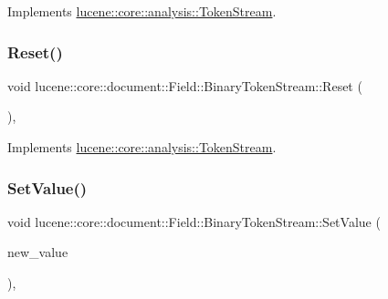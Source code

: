 Implements \mbox{\hyperlink{classlucene_1_1core_1_1analysis_1_1TokenStream_a614d4ea24a354d6f4354b4941b5124e2}{lucene\+::core\+::analysis\+::\+Token\+Stream}}.

\mbox{\label{classlucene_1_1core_1_1document_1_1Field_1_1BinaryTokenStream_adc2b2b0a6ea02054dfe5159628861911}} 
\subsubsection{\texorpdfstring{Reset()}{Reset()}}
{\footnotesize\ttfamily void lucene\+::core\+::document\+::\+Field\+::\+Binary\+Token\+Stream\+::\+Reset (\begin{DoxyParamCaption}{ }\end{DoxyParamCaption})\hspace{0.3cm}{\ttfamily [inline]}, {\ttfamily [virtual]}}



Implements \mbox{\hyperlink{classlucene_1_1core_1_1analysis_1_1TokenStream_ae24622f4bc0aeaf0bef924ff1661e023}{lucene\+::core\+::analysis\+::\+Token\+Stream}}.

\mbox{\label{classlucene_1_1core_1_1document_1_1Field_1_1BinaryTokenStream_af69fef506c491a451cb5ac1bca9f3ac4}} 
\subsubsection{\texorpdfstring{Set\+Value()}{SetValue()}\hspace{0.1cm}{\footnotesize\ttfamily [1/2]}}
{\footnotesize\ttfamily void lucene\+::core\+::document\+::\+Field\+::\+Binary\+Token\+Stream\+::\+Set\+Value (\begin{DoxyParamCaption}\item[{\mbox{\hyperlink{ZlibCrc32_8h_a2c212835823e3c54a8ab6d95c652660e}{const}} \mbox{\hyperlink{classlucene_1_1core_1_1util_1_1BytesRef}{lucene\+::core\+::util\+::\+Bytes\+Ref}} \&}]{new\+\_\+value }\end{DoxyParamCaption})\hspace{0.3cm}{\ttfamily [inline]}, {\ttfamily [noexcept]}}

